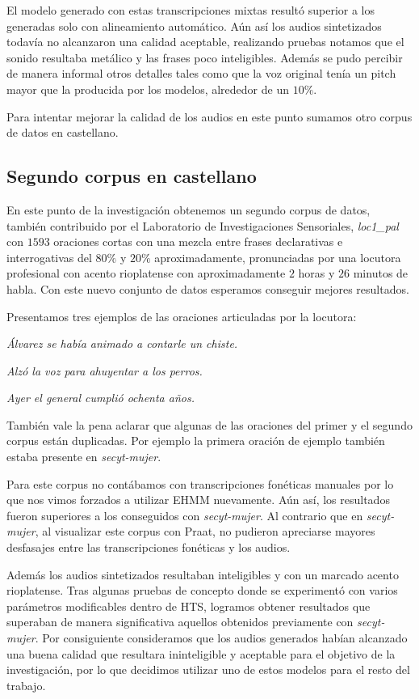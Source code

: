 El modelo generado con estas transcripciones mixtas resultó superior a los generadas solo con alineamiento automático. Aún así los audios sintetizados todavía no alcanzaron una calidad aceptable, realizando pruebas notamos que el sonido resultaba metálico y las frases poco inteligibles. Además se pudo percibir de manera informal otros detalles tales como que la voz original tenía un pitch mayor que la producida por los modelos, alrededor de un $10\%$.

Para intentar mejorar la calidad de los audios en este punto sumamos otro corpus de datos en castellano.

\subsection{Segundo corpus en castellano}

En este punto de la investigación obtenemos un segundo corpus de datos, también contribuido por el Laboratorio de Investigaciones Sensoriales, \textit{loc1\_pal} \cite{loc1pal} con $1593$ oraciones cortas con una mezcla entre frases declarativas e interrogativas del $80\%$ y $20\%$ aproximadamente, pronunciadas por una locutora profesional con acento rioplatense con aproximadamente $2$ horas y $26$ minutos de habla. Con este nuevo conjunto de datos esperamos conseguir mejores resultados.

Presentamos tres ejemplos de las oraciones articuladas por la locutora:

\indent\indent \textit{Álvarez se había animado a contarle un chiste.}

\indent\indent \textit{Alzó la voz para ahuyentar a los perros.}

\indent\indent \textit{Ayer el general cumplió ochenta años.}

También vale la pena aclarar que algunas de las oraciones del primer y el segundo corpus están duplicadas. Por ejemplo la primera oración de ejemplo también estaba presente en \textit{secyt-mujer}.

Para este corpus no contábamos con transcripciones fonéticas manuales por lo que nos vimos forzados a utilizar EHMM nuevamente. Aún así, los resultados fueron superiores a los conseguidos con \textit{secyt-mujer}. Al contrario que en \textit{secyt-mujer}, al visualizar este corpus con Praat, no pudieron apreciarse mayores desfasajes entre las transcripciones fonéticas y los audios.

Además los audios sintetizados resultaban inteligibles y con un marcado acento rioplatense. Tras algunas pruebas de concepto donde se experimentó con varios parámetros modificables dentro de HTS, logramos obtener resultados que superaban de manera significativa aquellos obtenidos previamente con \textit{secyt-mujer}. Por consiguiente consideramos que los audios generados habían alcanzado una buena calidad que resultara ininteligible y aceptable para el objetivo de la investigación, por lo que decidimos utilizar uno de estos modelos para el resto del trabajo.


